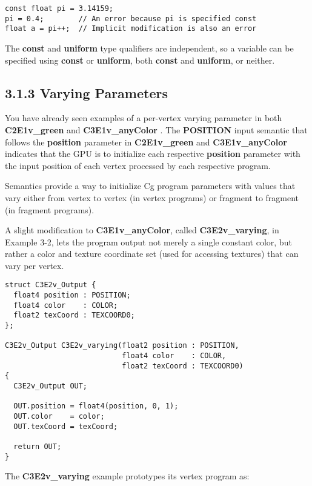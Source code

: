 \documentclass[../main.tex]{subfiles}
\begin{document}
\FloatBarrier
\begin{lstlisting}
const float pi = 3.14159;
pi = 0.4;        // An error because pi is specified const
float a = pi++;  // Implicit modification is also an error
\end{lstlisting}
\FloatBarrier

The \textbf{const} and \textbf{uniform} type qualifiers are independent, so a variable can be specified using \textbf{const} or \textbf{uniform}, both \textbf{const} and \textbf{uniform}, or neither.

\subsection{3.1.3 Varying Parameters}

You have already seen examples of a per-vertex varying parameter in both \textbf{C2E1v_green} and \textbf{C3E1v_anyColor} . The \textbf{POSITION} input semantic that follows the \textbf{position} parameter in \textbf{C2E1v_green} and \textbf{C3E1v_anyColor} indicates that the GPU is to initialize each respective \textbf{position} parameter with the input position of each vertex processed by each respective program.

Semantics provide a way to initialize Cg program parameters with values that vary either from vertex to vertex (in vertex programs) or fragment to fragment (in fragment programs).

A slight modification to \textbf{C3E1v_anyColor}, called \textbf{C3E2v_varying}, in Example 3-2, lets the program output not merely a single constant color, but rather a color and texture coordinate set (used for accessing textures) that can vary per vertex.

\FloatBarrier
\begin{lstlisting}[caption=Example 3-2. The C3E2v_varying Vertex Program]
struct C3E2v_Output {
  float4 position : POSITION;
  float4 color    : COLOR;
  float2 texCoord : TEXCOORD0;
};

C3E2v_Output C3E2v_varying(float2 position : POSITION,
                           float4 color    : COLOR,
                           float2 texCoord : TEXCOORD0)
{
  C3E2v_Output OUT;

  OUT.position = float4(position, 0, 1);
  OUT.color    = color;
  OUT.texCoord = texCoord;

  return OUT;
}
\end{lstlisting}
\FloatBarrier

The \textbf{C3E2v_varying} example prototypes its vertex program as:
\end{document}
